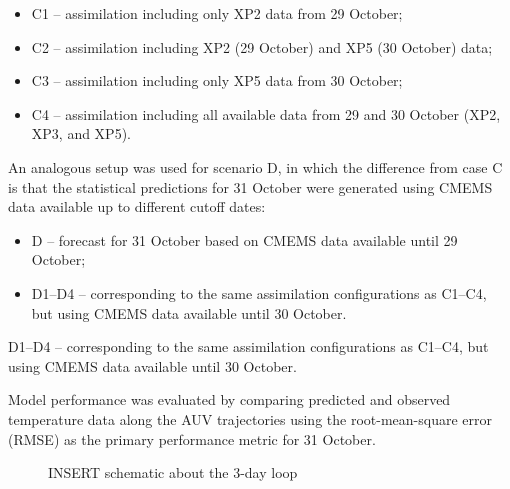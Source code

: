 \begin{itemize}
    \item C1 – assimilation including only XP2 data from 29 October;
    \item C2 – assimilation including XP2 (29 October) and XP5 (30 October) data;
    \item C3 – assimilation including only XP5 data from 30 October;
    \item C4 – assimilation including all available data from 29 and 30 October (XP2, XP3, and XP5).
\end{itemize}

An analogous setup was used for scenario D, in which the difference from case C is that the statistical predictions for 31 October were generated using CMEMS data available up to different cutoff dates:

\begin{itemize}
    \item D – forecast for 31 October based on CMEMS data available until 29 October;
    \item D1–D4 – corresponding to the same assimilation configurations as C1–C4, but using CMEMS data available until 30 October.
\end{itemize}
D1–D4 – corresponding to the same assimilation configurations as C1–C4, but using CMEMS data available until 30 October.

Model performance was evaluated by comparing predicted and observed temperature data along the AUV trajectories using the root-mean-square error (RMSE) as the primary performance metric for 31 October.

\begin{figure}
    \centering
    \caption{INSERT schematic about the 3-day loop}
    \label{fig:temperatureprofiles}
\end{figure}


%
    

